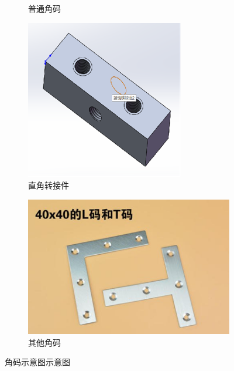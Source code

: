 \documentclass[UTF8]{article} %
\begin{document}
\begin{figure}[H]
\begin{subfigure}[b]{0.4\textwidth}
          \caption{普通角码}
  \end{subfigure}
  \quad
  \begin{subfigure}[b]{0.3\textwidth}
    \centering
    \includegraphics[width=\textwidth]{jiao3.png}
    \caption{直角转接件}
\end{subfigure}
\quad
\begin{subfigure}[b]{0.4\textwidth}
  \centering
  \includegraphics[width=\textwidth]{jiao4.png}
  \caption{其他角码}
\end{subfigure}
  \caption{角码示意图示意图}
\end{figure}
\end{document}
